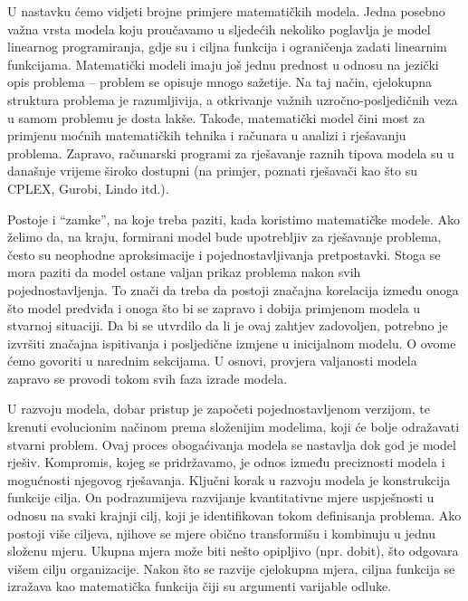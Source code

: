 \documentclass[a4paper, utf8, 11pt, colorlinks]{book}
\theoremstyle{definition}
\begin{document}
 U nastavku  ćemo vidjeti brojne primjere matematičkih modela. Jedna posebno važna vrsta modela koju proučavamo u sljedećih nekoliko poglavlja
je model linearnog programiranja, gdje su i ciljna funkcija i ograničenja zadati linearnim funkcijama. 
Matematički modeli imaju još jednu prednost u odnosu na jezički opis problema -- problem se opisuje mnogo sažetije. Na taj način, cjelokupna struktura problema je razumljivija, a otkrivanje važnih uzročno-posljedičnih veza u samom problemu je dosta lakše. Takođe, matematički
model čini most za primjenu moćnih matematičkih tehnika i računara u
analizi i rješavanju problema. Zapravo, računarski programi za rješavanje raznih tipova modela su  u današnje vrijeme  široko dostupni (na primjer, poznati rješavači kao što su CPLEX, Gurobi, Lindo itd.). 

  Postoje i ``zamke'', na koje treba paziti, kada koristimo matematičke modele. Ako želimo da, na kraju, formirani model bude upotrebljiv za rješavanje problema, često  su neophodne aproksimacije i pojednostavljivanja pretpostavki. Stoga se mora paziti da model ostane valjan prikaz problema nakon svih pojednostavljenja. To znači da treba da postoji značajna korelacija između onoga što model predviđa i onoga što bi se zapravo i dobija primjenom modela u stvarnoj situaciji. Da bi se utvrdilo da li je ovaj zahtjev zadovoljen, potrebno je izvršiti značajna ispitivanja i posljedične izmjene u inicijalnom modelu. O ovome ćemo govoriti u narednim sekcijama. U osnovi, provjera valjanosti modela zapravo se provodi tokom svih  faza izrade modela. 
  
 U razvoju modela, dobar pristup je započeti pojednostavljenom verzijom, te   krenuti evolucionim načinom prema složenijim modelima, koji će bolje odražavati  stvarni problem. Ovaj proces obogaćivanja modela se nastavlja dok god je model rješiv. Kompromis, kojeg se pridržavamo, je odnos između preciznosti modela i mogućnosti njegovog rješavanja. Ključni korak u razvoju modela je konstrukcija funkcije cilja.
On podrazumijeva razvijanje kvantitativne mjere uspješnosti u odnosu na svaki   krajnji cilj, koji je identifikovan tokom definisanja problema.
Ako postoji više ciljeva, njihove se mjere obično transformišu
i kombinuju u jednu složenu mjeru.  Ukupna mjera može biti nešto opipljivo (npr. dobit), što odgovara višem cilju
organizacije.  Nakon što se razvije cjelokupna mjera,  ciljna funkcija se izražava kao matematička funkcija čiji su argumenti varijable odluke. 
\end{document}
